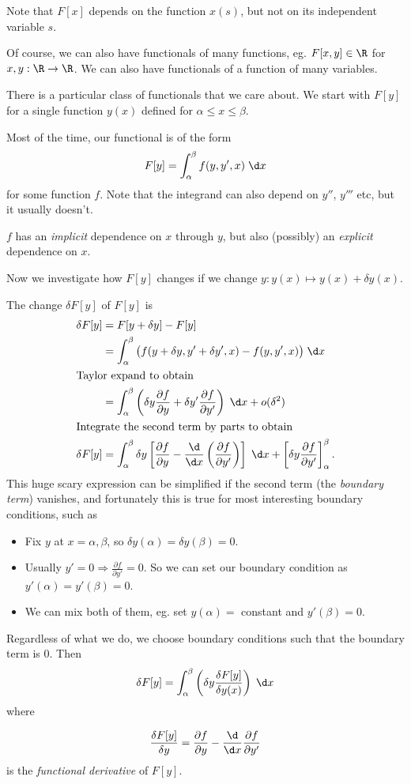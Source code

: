 \documentclass[a4paper]{article}
\begin{document}
Note that $F[x]$ depends on the function $x(s)$, but not on its independent variable $s$.

Of course, we can also have functionals of many functions, eg. $F[x, y]\in \R$ for $x, y: \R \to \R$. We can also have functionals of a function of many variables.

There is a particular class of functionals that we care about. We start with $F[y]$ for a single function $y(x)$ defined for $\alpha \leq x \leq \beta$.

Most of the time, our functional is of the form
\[
  F[y]  = \int_\alpha ^\beta f(y, y', x)\;\d x
\]
for some function $f$. Note that the integrand can also depend on $y''$, $y'''$ etc, but it usually doesn't.

$f$ has an \emph{implicit} dependence on $x$ through $y$, but also (possibly) an \emph{explicit} dependence on $x$.

Now we investigate how $F[y]$ changes if we change $y: y(x) \mapsto y(x) + \delta y(x)$.

The change $\delta F[y]$ of $F[y]$ is
\begin{align*}
  \delta F[y] &= F[y + \delta y] - F[y]\\
  &= \int_\alpha ^\beta \big(f(y + \delta y, y' + \delta y', x) - f(y, y', x)\big)\;\d x\\
  \intertext{Taylor expand to obtain}
  &= \int_\alpha^\beta  \left(\delta y\frac{\partial f}{\partial y} + \delta y' \frac{\partial f}{\partial y'}\right)\;\d x + o(\delta^2)\\
  \intertext{Integrate the second term by parts to obtain}
  \delta F[y] &= \int_\alpha^\beta\delta y\left[\frac{\partial f}{\partial y} - \frac{\d}{\d x}\left(\frac{\partial f}{\partial y'}\right)\right]\;\d x + \left[ \delta y\frac{\partial f}{\partial y'}\right]_\alpha^\beta.
\end{align*}
This huge scary expression can be simplified if the second term (the \emph{boundary term}) vanishes, and fortunately this is true for most interesting boundary conditions, such as
\begin{itemize}
  \item Fix $y$ at $x = \alpha, \beta$, so $\delta y(\alpha) = \delta y(\beta) = 0$.
  \item Usually $y' = 0 \Rightarrow \frac{\partial f}{\partial y'} = 0$. So we can set our boundary condition as $y'(\alpha) = y'(\beta) = 0$.
  \item We can mix both of them, eg. set $y(\alpha) =$ constant and $y'(\beta) = 0$.
\end{itemize}
Regardless of what we do, we choose boundary conditions such that the boundary term is 0. Then
\[
  \delta F[y] = \int_\alpha ^\beta \left(\delta y \frac{\delta F[y]}{\delta y(x)}\right)\;\d x
\]
where
\begin{defi}
  \[
    \frac{\delta F[y]}{\delta y} = \frac{\partial f}{\partial y} - \frac{\d }{\d x}\frac{\partial f}{\partial y'}
  \]
  is the \emph{functional derivative} of $F[y]$.
\end{defi}
\end{document}
